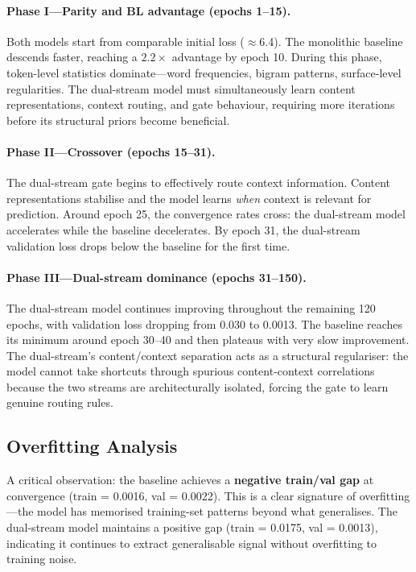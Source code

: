 \documentclass[11pt,a4paper]{article}
\theoremstyle{definition}
\begin{document}
\paragraph{Phase I---Parity and BL advantage (epochs 1--15).}
Both models start from comparable initial loss ($\approx$6.4). The monolithic baseline descends faster, reaching a $2.2\times$ advantage by epoch 10. During this phase, token-level statistics dominate---word frequencies, bigram patterns, surface-level regularities. The dual-stream model must simultaneously learn content representations, context routing, and gate behaviour, requiring more iterations before its structural priors become beneficial.

\paragraph{Phase II---Crossover (epochs 15--31).}
The dual-stream gate begins to effectively route context information. Content representations stabilise and the model learns \emph{when} context is relevant for prediction. Around epoch 25, the convergence rates cross: the dual-stream model accelerates while the baseline decelerates. By epoch 31, the dual-stream validation loss drops below the baseline for the first time.

\paragraph{Phase III---Dual-stream dominance (epochs 31--150).}
The dual-stream model continues improving throughout the remaining 120 epochs, with validation loss dropping from 0.030 to 0.0013. The baseline reaches its minimum around epoch 30--40 and then plateaus with very slow improvement. The dual-stream's content/context separation acts as a structural regulariser: the model cannot take shortcuts through spurious content-context correlations because the two streams are architecturally isolated, forcing the gate to learn genuine routing rules.

\subsection{Overfitting Analysis}

A critical observation: the baseline achieves a \textbf{negative train/val gap} at convergence (train = 0.0016, val = 0.0022). This is a clear signature of overfitting---the model has memorised training-set patterns beyond what generalises. The dual-stream model maintains a positive gap (train = 0.0175, val = 0.0013), indicating it continues to extract generalisable signal without overfitting to training noise.
\end{document}
